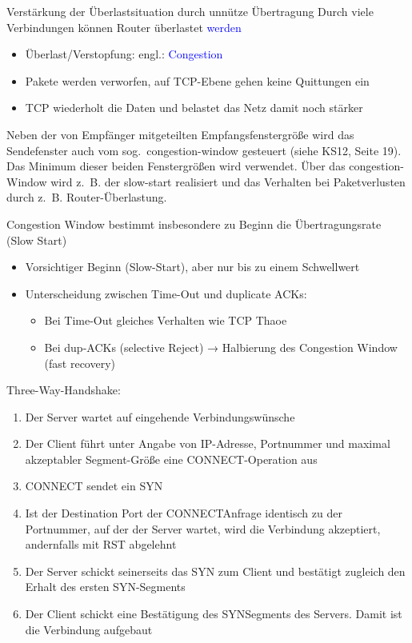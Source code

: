 Verstärkung der Überlastsituation durch unnütze Übertragung
Durch viele Verbindungen können Router überlastet \textcolor{blue}{werden}
\begin{itemize}
    \item Überlast/Verstopfung: engl.: \textcolor{blue}{Congestion}
    \item Pakete werden verworfen, auf TCP-Ebene gehen keine Quittungen ein
    \item TCP wiederholt die Daten und belastet das Netz damit noch stärker
\end{itemize}

Neben der von Empfänger mitgeteilten Empfangsfenstergröße wird das Sendefenster auch vom sog.\ congestion-window gesteuert (siehe KS12, Seite 19).
Das Minimum dieser beiden Fenstergrößen wird verwendet.
Über das congestion-Window wird z.\ B. der slow-start realisiert und das Verhalten bei Paketverlusten durch z.\ B. Router-Überlastung.

Congestion Window bestimmt insbesondere zu Beginn die Übertragungsrate (Slow Start)

\begin{itemize}
    \item Vorsichtiger Beginn (Slow-Start), aber nur bis zu einem Schwellwert
    \item Unterscheidung zwischen Time-Out und duplicate ACKs:
    \begin{itemize}
        \item Bei Time-Out gleiches Verhalten wie TCP Thaoe
        \item Bei dup-ACKs (selective Reject) → Halbierung des Congestion Window (fast recovery)
    \end{itemize}
\end{itemize}

Three-Way-Handshake:
\begin{enumerate}
    \item Der Server wartet auf eingehende Verbindungswünsche
    \item Der Client führt unter Angabe von IP-Adresse, Portnummer und maximal akzeptabler Segment-Größe eine CONNECT-Operation aus
    \item CONNECT sendet ein SYN
    \item Ist der Destination Port der CONNECTAnfrage identisch zu der Portnummer, auf der der Server wartet, wird die Verbindung akzeptiert, andernfalls mit RST abgelehnt
    \item Der Server schickt seinerseits das SYN zum Client und bestätigt zugleich den Erhalt des ersten SYN-Segments
    \item Der Client schickt eine Bestätigung des SYNSegments des Servers.
    Damit ist die Verbindung aufgebaut
\end{enumerate}

